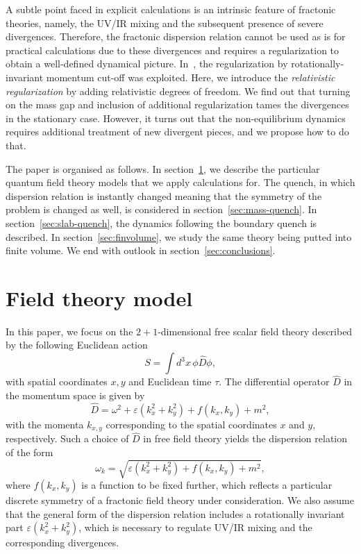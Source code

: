 \documentclass[a4paper,12pt]{article}
\newcommand{\be}{\begin{equation}}
\newcommand{\ee}{\end{equation}}
\newcommand{\eps}{\varepsilon}
\newcommand{\om}{\omega}
\newcommand{\secref}[1]{section~\ref{#1}}
\begin{document}
A subtle point faced in explicit calculations is an intrinsic feature of fractonic theories, namely, the UV/IR mixing and the subsequent presence of severe divergences. Therefore, the fractonic dispersion relation cannot be used as is for practical calculations due to these divergences and requires a regularization to obtain a well-defined dynamical picture. In~\cite{Distler:2021bop}, the regularization by rotationally-invariant momentum cut-off was exploited. Here, we introduce the \textit{relativistic regularization} by adding relativistic degrees of freedom. We find out that turning on the mass gap and inclusion of additional regularization tames the divergences in the stationary case. However, it turns out that the non-equilibrium dynamics requires additional treatment of new divergent pieces, and we propose how to do that.

The paper is organised as follows. In \secref{sec:setup}, we describe the particular quantum field theory models that we apply calculations for. The quench, in which dispersion relation is instantly changed meaning that the symmetry of the problem is changed as well, is considered in \secref{sec:mass-quench}. In \secref{sec:slab-quench}, the dynamics following the boundary quench is described. In \secref{sec:finvolume}, we study the same theory being putted into finite volume. We end with outlook in \secref{sec:conclusions}.

\section{Field theory model}
\label{sec:setup}

In this paper, we focus on the $2 + 1$-dimensional free scalar field theory described by the following Euclidean action
\be 
    S = \int d^3x\,\phi \hat{D} \phi,
\ee 
with spatial coordinates $x,y$ and Euclidean time $\tau$. The differential operator $\hat{D}$ in the momentum space is given by
\be 
    \hat{D} = \om^2 + \eps\left(k_x^2 + k_y^2\right) + f(k_x, k_y) + m^2,
\ee 
with the momenta $k_{x,y}$ corresponding to the spatial coordinates $x$ and $y$, respectively. Such a choice of $\hat{D}$ in free field theory yields the dispersion relation of the form
\be 
    \om_k = \sqrt{\eps\left(k_x^2 + k_y^2\right) + f(k_x, k_y) + m^2},
\ee 
where $f(k_x, k_y)$ is a function to be fixed further, which reflects a particular discrete symmetry of a fractonic field theory under consideration. We also assume that the general form of the dispersion relation includes a rotationally invariant part $\eps(k_x^2 + k_y^2)$, which is necessary to regulate UV/IR mixing and the corresponding divergences.
\end{document}
